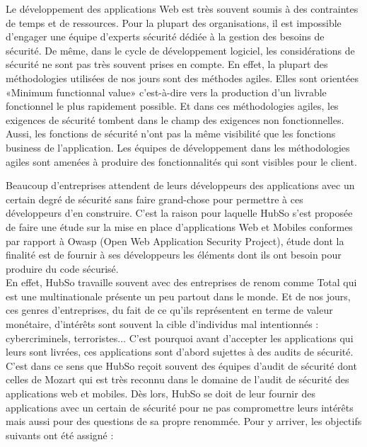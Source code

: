\begin{itemize}
	\itemtirait Le développement des applications Web est très souvent soumis à des contraintes de temps et de ressources. Pour la plupart des organisations, il est impossible d’engager une équipe d’experts sécurité dédiée à la gestion des besoins de sécurité. De même, dans le cycle de développement logiciel, les considérations de sécurité ne sont pas très souvent prises en compte. En effet, la plupart des méthodologies utilisées de nos jours sont des méthodes agiles. Elles sont orientées «Minimum functionnal value» c'est-à-dire vers la production d'un livrable fonctionnel le plus rapidement possible. Et dans ces méthodologies agiles, les exigences de sécurité tombent dans le champ des exigences non fonctionnelles. Aussi, les fonctions de sécurité n’ont pas la même visibilité que les fonctions business de l’application. Les équipes de développement dans les méthodologies agiles sont amenées à produire des fonctionnalités qui sont visibles pour le client.
\end{itemize}
Beaucoup d’entreprises attendent de leurs développeurs des applications avec un certain degré de sécurité sans faire grand-chose pour permettre à ces développeurs d’en construire. C'est la raison pour laquelle HubSo s'est proposée de faire une étude sur la mise en place d'applications Web et Mobiles conformes par rapport à Owasp (Open Web Application Security Project),  étude dont la finalité est de fournir à ses développeurs les éléments dont ils ont besoin pour produire du code sécurisé. \\
En effet, HubSo travaille souvent avec des entreprises de renom comme Total qui est une multinationale présente un peu partout dans le monde. Et de nos jours, ces genres d'entreprises, du fait de ce qu'ils représentent en terme de valeur monétaire, d'intérêts sont souvent la cible d'individus mal intentionnés : cybercriminels, terroristes... C'est pourquoi avant d'accepter les applications qui leurs sont livrées, ces applications sont d'abord sujettes à des audits de sécurité. C'est dans ce sens que HubSo reçoit souvent des équipes d'audit de sécurité dont celles de Mozart qui est très reconnu dans le domaine de l'audit de sécurité des applications web et mobiles. Dès lors, HubSo se doit de leur fournir des applications avec un certain de sécurité pour ne pas compromettre leurs intérêts mais aussi pour des questions de sa propre renommée.
Pour y arriver, les objectifs suivants ont été assigné :
